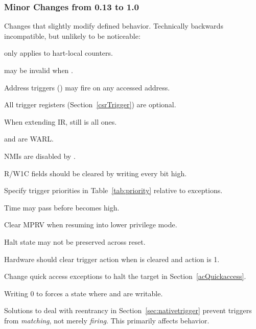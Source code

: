 \subsubsection{Minor Changes from 0.13 to 1.0}

\begin{steps}{Changes that slightly modify defined behavior. Technically backwards
incompatible, but unlikely to be noticeable:}
    \item \FcsrDcsrStopcount only applies to hart-local counters. 
    \item \FdmDmstatusVersion may be invalid when . 
    \item Address triggers (\RcsrMcontrol) may fire on any accessed address. 
    \item All trigger registers (Section~\ref{csrTrigger}) are optional. 
    \item When extending IR, \RdtmBypass still is all ones. 
    \item \FcsrDcsrEbreaks and \FcsrDcsrEbreaku are WARL. 
    \item NMIs are disabled by \FcsrDcsrStepie. 
    \item R/W1C fields should be cleared by writing every bit high. 
    \item Specify trigger priorities in Table~\ref{tab:priority} relative to exceptions. 
    \item Time may pass before \FdmDmcontrolDmactive becomes high. 
    \item Clear MPRV when resuming into lower privilege mode. 
    \item Halt state may not be preserved across reset. 
    \item Hardware should clear trigger action when \FcsrTdataOneDmode is
        cleared and action is 1. 
    \item Change quick access exceptions to halt the target in
    Section~\ref{acQuickaccess}. 
    \item Writing 0 to \RcsrTdataOne forces a state where \RcsrTdataTwo and
        \RcsrTdataThree are writable. 
    \item Solutions to deal with reentrancy in Section~\ref{sec:nativetrigger}
        prevent triggers from {\em matching}, not merely {\em firing}. This primarily
        affects \RcsrIcount behavior. 
\end{steps}

